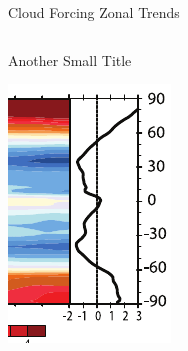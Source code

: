 \documentclass[10pt,t]{beamer}
\begin{document}
\begin{frame}[label={sec:orgd0b9c54}]{Cloud Forcing Zonal Trends}
\begin{columns}
\begin{column}{0.33\columnwidth}
\begin{block}{\footnotesize Another Small Title}
\vspace{-0.1in}
\begin{center}
\includegraphics[width=\linewidth]{./Figs/Pdf/trenberth_total_only.pdf}
\end{center}
\end{block}
\end{column}


\end{columns}
\end{frame}
\end{document}
